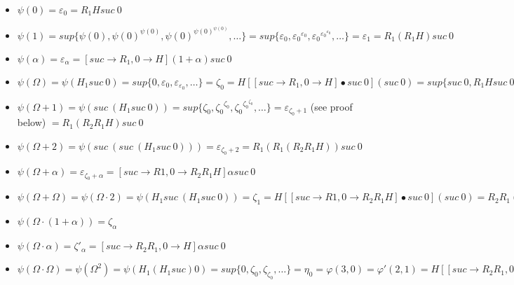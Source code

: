 \documentclass[10pt]{article}
\begin{document}
\begin{itemize}
     \setlength{\itemsep}{1pt}
     \setlength{\parskip}{0pt}
     \setlength{\parsep}{0pt}

\item \( \psi(0) = \varepsilon_0 = R_1 H suc\ 0 \)

\item \( \psi(1) = sup \lbrace \psi(0), \psi(0)^{\psi(0)}, \psi(0)^{\psi(0)^{\psi(0)}}, \ldots \rbrace = sup \lbrace \varepsilon_0, {\varepsilon_0}^{\varepsilon_0}, {\varepsilon_0}^{{\varepsilon_0}^{\varepsilon_0}}, \ldots \rbrace = \varepsilon_1 = R_1 (R_1 H) suc\ 0 \)

\item \( \psi(\alpha) = \varepsilon_\alpha = [suc \rightarrow R_1,0 \rightarrow H] (1+\alpha) suc\ 0 \)

\item \( \psi(\Omega) = \psi(H_1 suc\ 0) = sup \lbrace 0, \varepsilon_0, \varepsilon_{\varepsilon_0}, \ldots \rbrace = \zeta_0 = H [[suc \rightarrow R_1,0 \rightarrow H] \bullet suc\ 0] (suc\ 0) = sup \lbrace suc\ 0, R_1 H suc\ 0, R_1 H R_1 H suc\ 0, \ldots \rbrace = R_2 R_1 H suc\ 0 \)

\item \( \psi(\Omega+1) = \psi(suc\ (H_1 suc\ 0)) = sup \lbrace \zeta_0, {\zeta_0}^{\zeta_0}, {\zeta_0}^{{\zeta_0}^{\zeta_0}}, \ldots \rbrace = \varepsilon_{\zeta_0+1} \) (see proof below) \( = R_1 (R_2 R_1 H) suc\ 0 \)

\item \( \psi(\Omega+2) = \psi(suc\ (suc\ (H_1 suc\ 0))) = \varepsilon_{\zeta_0+2} = R_1 (R_1 (R_2 R_1 H)) suc\ 0 \)

\item \( \psi(\Omega+\alpha) = \varepsilon_{\zeta_0+\alpha} = [suc \rightarrow R1, 0 \rightarrow R_2 R_1 H] \alpha suc\ 0 \)

\item \( \psi(\Omega+\Omega) = \psi(\Omega \cdot 2) = \psi(H_1 suc\ (H_1 suc\ 0)) = \zeta_1 = H [[suc \rightarrow R1, 0 \rightarrow R_2 R_1 H] \bullet suc\ 0] (suc\ 0) = R_2 R_1 (R_2 R_1 H) suc\ 0 \)

\item \( \psi(\Omega \cdot (1+\alpha)) = \zeta_\alpha \)

\item \( \psi(\Omega \cdot \alpha) = \zeta'_\alpha = [suc \rightarrow R_2 R_1, 0 \rightarrow H] \alpha suc\ 0 \)

\item \( \psi(\Omega \cdot \Omega) = \psi(\Omega^2) = \psi (H_1 (H_1 suc) 0) = sup \lbrace 0, \zeta_0, \zeta_{\zeta_0}, \ldots \rbrace = \eta_0 = \varphi(3,0) = \varphi'(2,1) = H [[suc \rightarrow R_2 R_1, 0 \rightarrow H] \bullet suc\ 0] (suc\ 0) = R_2 (R_2 R_1) H suc\ 0 \)


\end{itemize}
\end{document}

